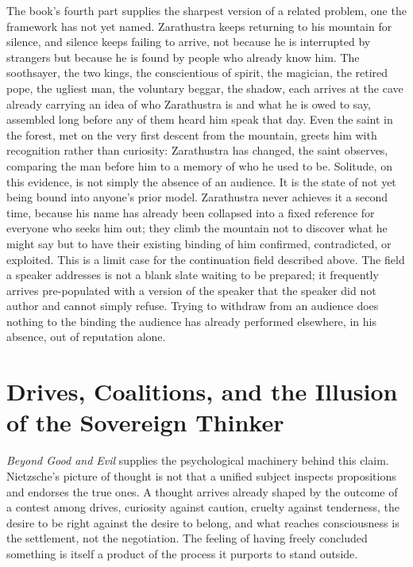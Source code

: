 \documentclass[11pt]{article}
\begin{document}
The book's fourth part supplies the sharpest version of a related problem, one the framework has not yet named. Zarathustra keeps returning to his mountain for silence, and silence keeps failing to arrive, not because he is interrupted by strangers but because he is found by people who already know him. The soothsayer, the two kings, the conscientious of spirit, the magician, the retired pope, the ugliest man, the voluntary beggar, the shadow, each arrives at the cave already carrying an idea of who Zarathustra is and what he is owed to say, assembled long before any of them heard him speak that day. Even the saint in the forest, met on the very first descent from the mountain, greets him with recognition rather than curiosity: Zarathustra has changed, the saint observes, comparing the man before him to a memory of who he used to be. Solitude, on this evidence, is not simply the absence of an audience. It is the state of not yet being bound into anyone's prior model. Zarathustra never achieves it a second time, because his name has already been collapsed into a fixed reference for everyone who seeks him out; they climb the mountain not to discover what he might say but to have their existing binding of him confirmed, contradicted, or exploited. This is a limit case for the continuation field described above. The field a speaker addresses is not a blank slate waiting to be prepared; it frequently arrives pre-populated with a version of the speaker that the speaker did not author and cannot simply refuse. Trying to withdraw from an audience does nothing to the binding the audience has already performed elsewhere, in his absence, out of reputation alone.

\section*{Drives, Coalitions, and the Illusion of the Sovereign Thinker}

\emph{Beyond Good and Evil} supplies the psychological machinery behind this claim. Nietzsche's picture of thought is not that a unified subject inspects propositions and endorses the true ones. A thought arrives already shaped by the outcome of a contest among drives, curiosity against caution, cruelty against tenderness, the desire to be right against the desire to belong, and what reaches consciousness is the settlement, not the negotiation. The feeling of having freely concluded something is itself a product of the process it purports to stand outside.
\end{document}
